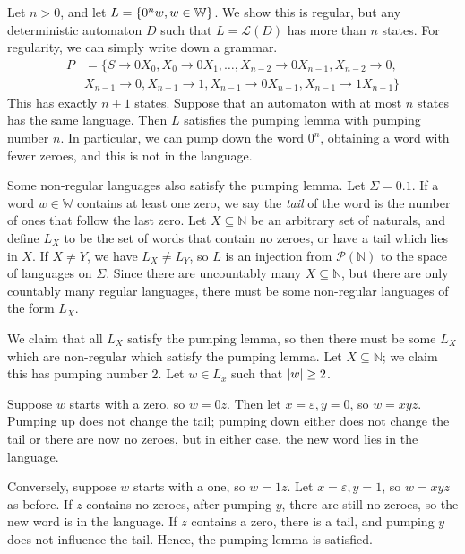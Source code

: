 \begin{example}
	Let \( n > 0 \), and let \( L = \qty{0^n w, w \in \mathbb W} \).
	We show this is regular, but any deterministic automaton \( D \) such that \( L = \mathcal L(D) \) has more than \( n \) states.
	For regularity, we can simply write down a grammar.
	\begin{align*}
		P &= \{S \to 0X_0, X_0 \to 0X_1, \dots, X_{n-2} \to 0X_{n-1}, X_{n-2} \to 0, \\
		&X_{n-1} \to 0, X_{n-1} \to 1, X_{n-1} \to 0X_{n-1}, X_{n-1} \to 1X_{n-1}\}
	\end{align*}
	This has exactly \( n + 1 \) states.
	Suppose that an automaton with at most \( n \) states has the same language.
	Then \( L \) satisfies the pumping lemma with pumping number \( n \).
	In particular, we can pump down the word \( 0^n \), obtaining a word with fewer zeroes, and this is not in the language.
\end{example}
\begin{example}
	Some non-regular languages also satisfy the pumping lemma.
	Let \( \Sigma = \qty{0,1} \).
	If a word \( w \in \mathbb W \) contains at least one zero, we say the \emph{tail} of the word is the number of ones that follow the last zero.
	Let \( X \subseteq \mathbb N \) be an arbitrary set of naturals, and define \( L_X \) to be the set of words that contain no zeroes, or have a tail which lies in \( X \).
	If \( X \neq Y \), we have \( L_X \neq L_Y \), so \( L \) is an injection from \( \mathcal P(\mathbb N) \) to the space of languages on \( \Sigma \).
	Since there are uncountably many \( X \subseteq \mathbb N \), but there are only countably many regular languages, there must be some non-regular languages of the form \( L_X \).

	We claim that all \( L_X \) satisfy the pumping lemma, so then there must be some \( L_X \) which are non-regular which satisfy the pumping lemma.
	Let \( X \subseteq \mathbb N \); we claim this has pumping number 2.
	Let \( w \in L_x \) such that \( \abs{w} \geq 2 \).

	Suppose \( w \) starts with a zero, so \( w = 0z \).
	Then let \( x = \varepsilon, y = 0 \), so \( w = xyz \).
	Pumping up does not change the tail; pumping down either does not change the tail or there are now no zeroes, but in either case, the new word lies in the language.

	Conversely, suppose \( w \) starts with a one, so \( w = 1z \).
	Let \( x = \varepsilon, y = 1 \), so \( w = xyz \) as before.
	If \( z \) contains no zeroes, after pumping \( y \), there are still no zeroes, so the new word is in the language.
	If \( z \) contains a zero, there is a tail, and pumping \( y \) does not influence the tail.
	Hence, the pumping lemma is satisfied.
\end{example}

